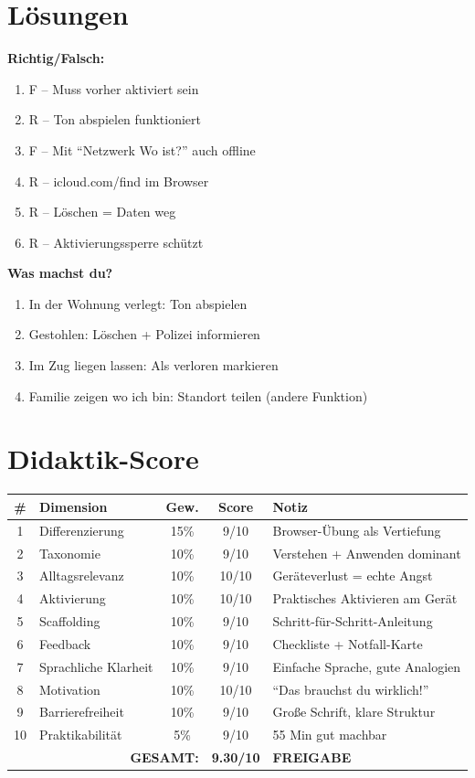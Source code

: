 \documentclass[11pt,a4paper]{article}
\begin{document}
\section{Lösungen}

\textbf{Richtig/Falsch:}
\begin{enumerate}
    \item F -- Muss vorher aktiviert sein
    \item R -- Ton abspielen funktioniert
    \item F -- Mit ``Netzwerk Wo ist?'' auch offline
    \item R -- icloud.com/find im Browser
    \item R -- Löschen = Daten weg
    \item R -- Aktivierungssperre schützt
\end{enumerate}

\textbf{Was machst du?}
\begin{enumerate}
    \item In der Wohnung verlegt: Ton abspielen
    \item Gestohlen: Löschen + Polizei informieren
    \item Im Zug liegen lassen: Als verloren markieren
    \item Familie zeigen wo ich bin: Standort teilen (andere Funktion)
\end{enumerate}

\section{Didaktik-Score}

\begin{scorebox}
\begin{tabular}{|c|l|c|c|p{3.5cm}|}
\hline
\# & Dimension & Gew. & Score & Notiz \\
\hline
1 & Differenzierung & 15\% & 9/10 & Browser-Übung als Vertiefung \\
2 & Taxonomie & 10\% & 9/10 & Verstehen + Anwenden dominant \\
3 & Alltagsrelevanz & 10\% & 10/10 & Geräteverlust = echte Angst \\
4 & Aktivierung & 10\% & 10/10 & Praktisches Aktivieren am Gerät \\
5 & Scaffolding & 10\% & 9/10 & Schritt-für-Schritt-Anleitung \\
6 & Feedback & 10\% & 9/10 & Checkliste + Notfall-Karte \\
7 & Sprachliche Klarheit & 10\% & 9/10 & Einfache Sprache, gute Analogien \\
8 & Motivation & 10\% & 10/10 & ``Das brauchst du wirklich!'' \\
9 & Barrierefreiheit & 10\% & 9/10 & Große Schrift, klare Struktur \\
10 & Praktikabilität & 5\% & 9/10 & 55 Min gut machbar \\
\hline
\multicolumn{3}{|r|}{\textbf{GESAMT:}} & \textbf{9.30/10} & \textcolor{successgreen}{\textbf{FREIGABE}} \\
\hline
\end{tabular}
\end{scorebox}
\end{document}
